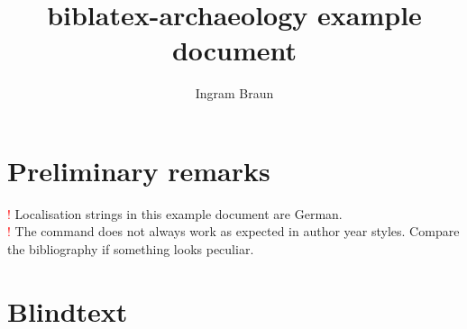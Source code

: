 \documentclass[a4paper,12pt]{scrartcl}
\title{biblatex-archaeology example document}
\subtitle{\explhead}
\author{Ingram Braun}
\newcommand{\exmplwarn}[1]{\textcolor{red}{\Huge!} #1\\}
\begin{document}
\maketitle
\tableofcontents

\section{Preliminary remarks}

\exmplwarn{Localisation strings in this example document are German.}
    {\exmplwarn{The \detokenize{\fullcite} command does not always work as expected in author year styles. Compare the bibliography if something looks peculiar.}%
    }
    {}

\section{Blindtext}
\end{document}
